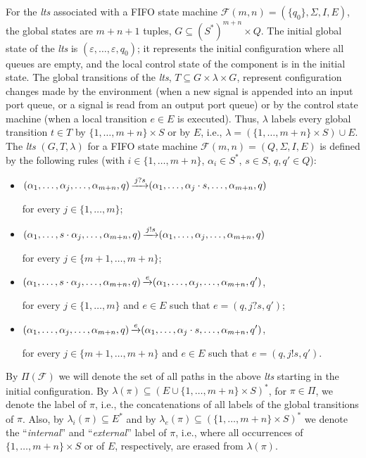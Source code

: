 \documentclass{llncs}
\newcommand{\fleche}[1]{\displaystyle \mathop {\mbox{\rightarrowfill}}^{#1} }
\begin{document}
For the \emph{lts} associated with a FIFO state machine
$\mathcal{F}(m,n)=(\{q_0\},\Sigma,I,E)$, the global states are $m+n+1$
tuples, $G\subseteq(S^\ast)^{m+n}\times Q$. The initial global state of the \emph{lts} is
$(\varepsilon,\ldots,\varepsilon,q_0)$; it represents
the initial configuration where all queues are empty, and the local
control state of the component is in the initial state. The global
transitions of the \emph{lts}, $T\subseteq G\times\lambda\times G$,
represent configuration changes made by the environment (when a new
signal is appended into an input port queue, or a signal is read from
an output port queue) or by the control state machine (when a local
transition $e\in E$ is executed). Thus, $\lambda$ labels every global
transition $t\in T$ by $\{1,\ldots,m+n\}\times S$ or by $E$, i.e.,
$\lambda=(\{1,\ldots,m+n\}\times S) \cup E$.  The \emph{lts}
$(G,T,\lambda)$ for a FIFO state machine
$\mathcal{F}(m,n)=(Q,\Sigma,I,E)$ is defined by the following rules
(with $i\in\{1,\ldots,m+n\}$, $\alpha_i\in S^\ast$, $s\in S$, $q,q'\in Q$):
\begin{itemize}
\item
  $(\alpha_1,\ldots,\alpha_j,\ldots,\alpha_{m+n}, q)
  \fleche{~j?s~}
  (\alpha_1,\ldots,\alpha_j\cdot s,\ldots,\alpha_{m+n}, q)$

  for every $j\in\{1,\ldots,m\}$;

\item
  $(\alpha_1,\ldots,s\cdot\alpha_j,\ldots,\alpha_{m+n},q)
  \fleche{~j!s~}
  (\alpha_1,\ldots,\alpha_j,\ldots,\alpha_{m+n}, q)$

  for every $j\in\{m+1,\ldots,m+n\}$;

\item $(\alpha_1,\ldots,s\cdot\alpha_j,\ldots,\alpha_{m+n},q)
  \fleche{~e~}
  (\alpha_1,\ldots,\alpha_j,\ldots,\alpha_{m+n},q')$,

  for every $j\in\{1,\ldots,m\}$ and $e\in E$ such that $e=(q,j?s,q')$;

\item $(\alpha_1,\ldots,\alpha_j,\ldots,\alpha_{m+n},q)\fleche{~e~}
  (\alpha_1,\ldots,\alpha_j\cdot s,\ldots,\alpha_{m+n},q')$,

  for every $j\in\{m+1,\ldots,m+n\}$ and $e\in E$ such that $e=(q,j!s,q')$.
\end{itemize}

By $\Pi(\mathcal{F})$ we will denote the set of all paths in the above
\emph{lts} starting in the initial configuration. By
$\lambda(\pi)\subseteq(E\cup\{1,\ldots,m+n\}\times S)^\ast$, for
$\pi\in\Pi$, we denote the label of $\pi$, i.e., the concatenations of
all labels of the global transitions of $\pi$. Also, by
$\lambda_i(\pi)\subseteq E^\ast$ and by $\lambda_e(\pi)\subseteq
(\{1,\ldots,m+n\}\times S)^\ast$ we denote the ``\emph{internal}'' and
``\emph{external}'' label of $\pi$, i.e., where all occurrences of
$\{1,\ldots,m+n\}\times S$ or of $E$, respectively, are erased from
$\lambda(\pi)$.
\end{document}
